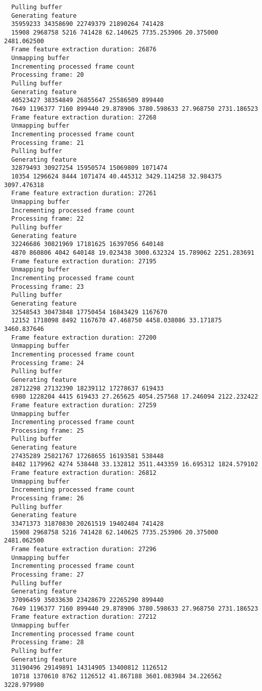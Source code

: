 \documentclass[12pt,oneside]{book}
\begin{document}
\begin{lstlisting}
  Pulling buffer
  Generating feature
  35959233 34358690 22749379 21890264 741428
  15908 2968758 5216 741428 62.140625 7735.253906 20.375000 2481.062500
  Frame feature extraction duration: 26876
  Unmapping buffer
  Incrementing processed frame count
  Processing frame: 20
  Pulling buffer
  Generating feature
  40523427 38354849 26855647 25586509 899440
  7649 1196377 7160 899440 29.878906 3780.598633 27.968750 2731.186523
  Frame feature extraction duration: 27268
  Unmapping buffer
  Incrementing processed frame count
  Processing frame: 21
  Pulling buffer
  Generating feature
  32879493 30927254 15950574 15069809 1071474
  10354 1296624 8444 1071474 40.445312 3429.114258 32.984375 3097.476318
  Frame feature extraction duration: 27261
  Unmapping buffer
  Incrementing processed frame count
  Processing frame: 22
  Pulling buffer
  Generating feature
  32246686 30821969 17181625 16397056 640148
  4870 860806 4042 640148 19.023438 3000.632324 15.789062 2251.283691
  Frame feature extraction duration: 27195
  Unmapping buffer
  Incrementing processed frame count
  Processing frame: 23
  Pulling buffer
  Generating feature
  32548543 30473848 17750454 16843429 1167670
  12152 1718098 8492 1167670 47.468750 4458.038086 33.171875 3460.837646
  Frame feature extraction duration: 27200
  Unmapping buffer
  Incrementing processed frame count
  Processing frame: 24
  Pulling buffer
  Generating feature
  28712298 27132390 18239112 17278637 619433
  6980 1228204 4415 619433 27.265625 4054.257568 17.246094 2122.232422
  Frame feature extraction duration: 27259
  Unmapping buffer
  Incrementing processed frame count
  Processing frame: 25
  Pulling buffer
  Generating feature
  27435289 25821767 17268655 16193581 538448
  8482 1179962 4274 538448 33.132812 3511.443359 16.695312 1824.579102
  Frame feature extraction duration: 26812
  Unmapping buffer
  Incrementing processed frame count
  Processing frame: 26
  Pulling buffer
  Generating feature
  33471373 31870830 20261519 19402404 741428
  15908 2968758 5216 741428 62.140625 7735.253906 20.375000 2481.062500
  Frame feature extraction duration: 27296
  Unmapping buffer
  Incrementing processed frame count
  Processing frame: 27
  Pulling buffer
  Generating feature
  37096459 35033630 23428679 22265290 899440
  7649 1196377 7160 899440 29.878906 3780.598633 27.968750 2731.186523
  Frame feature extraction duration: 27212
  Unmapping buffer
  Incrementing processed frame count
  Processing frame: 28
  Pulling buffer
  Generating feature
  31190496 29149891 14314905 13400812 1126512
  10718 1370610 8762 1126512 41.867188 3601.083984 34.226562 3228.979980

\end{lstlisting}
\end{document}
